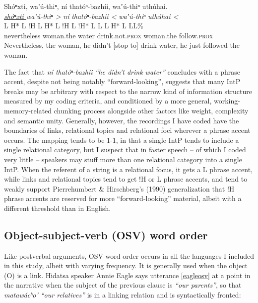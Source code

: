 \documentclass[output=paper]{LSP/langsci}
\begin{document}
\ea\label{wolfeintp}
 	Shóⁿxti, wa’ú-thiⁿ, ní thatóⁿ-bazhíi, waʼú-thiⁿ uthúhai.\footnotemark\\
\glll	\emph{\underline{shóⁿxti }}	\emph{wa’ú-thiⁿ >}		\emph{ní} 		\emph{thatóⁿ-bazhíi <}		\emph{waʼú-thiⁿ} 	\emph{uthúhai <}\\
	{\ob L H* L !H\cb}			{\ob L H* L !H\cb}		{\ob L}		{!H* L L\cb}	{\ob L H* L}		{L\cb{}L\%}\\
	nevertheless				woman.the			water			drink.not.\textsc{prox} 		woman.the		follow.\textsc{prox}\\
\glt	Nevertheless, the woman, he didn’t [stop to] drink water, he just followed the woman. 
\z

The fact that \emph{ní thatóⁿ-bazhíi “he didn’t drink water”} concludes with a phrase accent, despite not being notably “forward-looking”, suggests that many IntP breaks may be arbitrary with respect to the narrow kind of information structure measured by my coding criteria, and conditioned by a more general, working-memory-related chunking process alongside other factors like weight, complexity and semantic unity. Generally, however, the recordings I have coded have the boundaries of links, relational topics and relational foci wherever a phrase accent occurs. The mapping tends to be 1-1, in that a single IntP tends to include a single relational category, but I suspect that in faster speech -- of which I coded very little -- speakers may stuff more than one relational category into a single IntP. When the referent of a string is a relational focus, it gets a L phrase accent, while links and relational topics tend to get !H or L phrase accents, and tend to weakly support Pierrehumbert \& Hirschberg’s (1990) generalization that !H phrase accents are reserved for more “forward-looking” material, albeit with a different threshold than in English.

\subsection{Object-subject-verb (OSV) word order}\label{osv}

Like postverbal arguments, OSV word order occurs in all the languages I included in this study, albeit with varying frequency. It is generally used when the object (O) is a link. Hidatsa speaker Annie Eagle says utterance \ref{eagleosv} at a point in the narrative when the subject of the previous clause is ‎\emph{“our parents”}, so that \emph{matawácʰo’ “our relatives”} is in a linking relation and is syntactically fronted:
\end{document}
